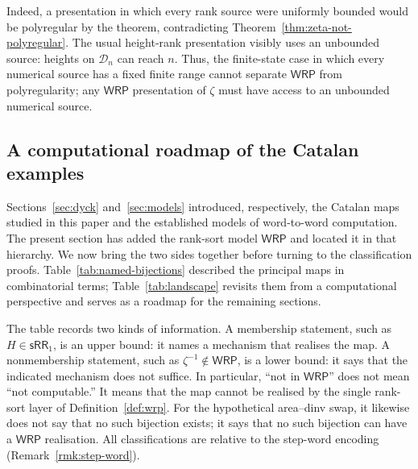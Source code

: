 \documentclass[11pt]{article}
\theoremstyle{definition}
\newcommand{\D}{\mathcal D}
\newcommand{\WRP}{\mathsf{WRP}}
\newcommand{\SWR}{\mathsf{sRR}_1}
\begin{document}
Indeed, a presentation in which every rank source were uniformly bounded
would be polyregular by the theorem, contradicting
Theorem~\ref{thm:zeta-not-polyregular}.  The usual height-rank presentation
visibly uses an unbounded source: heights on
$\D_n$ can reach $n$.  Thus, the finite-state case in which every numerical
source has a fixed finite range cannot separate $\WRP$ from polyregularity;
any $\WRP$ presentation of $\zeta$ must have access to an unbounded numerical
source.


\subsection{A computational roadmap of the Catalan examples}
\label{sec:landscape}

Sections~\ref{sec:dyck} and~\ref{sec:models} introduced, respectively, the
Catalan maps studied in this paper and the established models of word-to-word
computation.  The present section has added the rank-sort model $\WRP$ and
located it in that hierarchy.  We now bring the two sides together before
turning to the classification proofs.  Table~\ref{tab:named-bijections}
described the principal maps in combinatorial terms;
Table~\ref{tab:landscape} revisits them from a computational perspective and
serves as a roadmap for the remaining sections.

The table records two kinds of information.  A membership statement, such as
$H\in\SWR$, is an upper bound: it names a mechanism that realises the map.  A
nonmembership statement, such as $\zeta^{-1}\notin\WRP$, is a lower bound: it
says that the indicated mechanism does not suffice.  In particular, ``not in
$\WRP$'' does not mean ``not computable.''  It means that the map cannot be
realised by the single rank-sort layer of Definition~\ref{def:wrp}.  For the
hypothetical area--dinv swap, it likewise does not say that no such bijection
exists; it says that no such bijection can have a $\WRP$ realisation.  All
classifications are relative to the step-word encoding
(Remark~\ref{rmk:step-word}).
\end{document}
